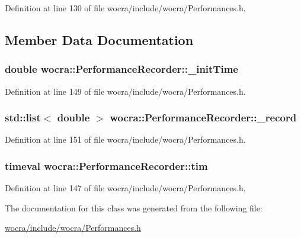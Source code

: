 Definition at line 130 of file wocra/include/wocra/\+Performances.\+h.



\subsection{Member Data Documentation}
\subsubsection[{\texorpdfstring{\+\_\+init\+Time}{_initTime}}]{\setlength{\rightskip}{0pt plus 5cm}double wocra\+::\+Performance\+Recorder\+::\+\_\+init\+Time\hspace{0.3cm}{\ttfamily [protected]}}\hypertarget{classwocra_1_1PerformanceRecorder_a24a1f84e36d1a53d93fc88f4ec852b18}{}\label{classwocra_1_1PerformanceRecorder_a24a1f84e36d1a53d93fc88f4ec852b18}


Definition at line 149 of file wocra/include/wocra/\+Performances.\+h.

\subsubsection[{\texorpdfstring{\+\_\+record}{_record}}]{\setlength{\rightskip}{0pt plus 5cm}std\+::list$<$ double $>$ wocra\+::\+Performance\+Recorder\+::\+\_\+record\hspace{0.3cm}{\ttfamily [protected]}}\hypertarget{classwocra_1_1PerformanceRecorder_aafecfdfef2e3b0d987cbb394a185e741}{}\label{classwocra_1_1PerformanceRecorder_aafecfdfef2e3b0d987cbb394a185e741}


Definition at line 151 of file wocra/include/wocra/\+Performances.\+h.

\subsubsection[{\texorpdfstring{tim}{tim}}]{\setlength{\rightskip}{0pt plus 5cm}timeval wocra\+::\+Performance\+Recorder\+::tim\hspace{0.3cm}{\ttfamily [protected]}}\hypertarget{classwocra_1_1PerformanceRecorder_ad66f50acd0ca84db58c753406e25da75}{}\label{classwocra_1_1PerformanceRecorder_ad66f50acd0ca84db58c753406e25da75}


Definition at line 147 of file wocra/include/wocra/\+Performances.\+h.



The documentation for this class was generated from the following file\+:\begin{DoxyCompactItemize}
\item 
\hyperlink{wocra_2include_2wocra_2Performances_8h}{wocra/include/wocra/\+Performances.\+h}\end{DoxyCompactItemize}
